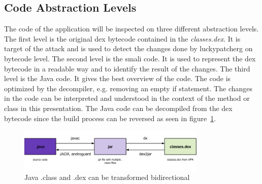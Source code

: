 \subsection{Code Abstraction Levels}
The code of the application will be inspected on three different abstraction levels.
\newline
The first level is the original dex bytecode contained in the \textit{classes.dex}.
It is target of the attack and is used to detect the changes done by \gls{luckypatcherg} on bytecode level.
\newline
The second level is the smali code.
It is used to represent the dex bytecode in a readable way and to identify the result of the changes.
\newline
The third level is the Java code.
It gives the best overview of the code.
The code is optimized by the decompiler, e.g. removing an empty if statement.
The changes in the code can be interpreted and understood in the context of the method or class in this presentation.
\newline
The Java code can be decompiled from the dex bytecode since the build process can be reversed as seen in figure~\ref{fig:re1}.
\newline
\begin{figure}[h]
    \centering
    \includegraphics[width=0.8\textwidth]{data/re1.png}
    \caption{Java .class and .dex can be transformed bidirectional \cite{andevconDalvikART}}
    \label{fig:re1}
\end{figure}

